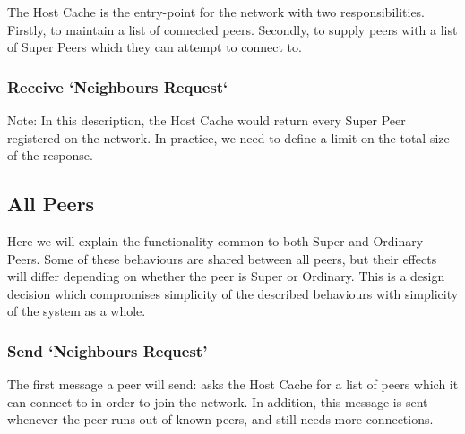 The Host Cache is the entry-point for the network with two responsibilities.
Firstly, to maintain a list of connected peers. Secondly, to supply peers with a
list of Super Peers which they can attempt to connect to.

\subsubsection{Receive `Neighbours Request`}

Note: In this description, the Host Cache would return every Super Peer
registered on the network. In practice, we need to define a limit on the total
size of the response.

\begin{algorithm}[H]

  \;
\end{algorithm}

\subsection{All Peers}

Here we will explain the functionality common to both Super and Ordinary Peers.
Some of these behaviours are shared between all peers, but their effects will
differ depending on whether the peer is Super or Ordinary.  This is a design
decision which compromises simplicity of the described behaviours with
simplicity of the system as a whole.

\subsubsection{Send `Neighbours Request'}

The first message a peer will send: asks the Host Cache for a list of peers
which it can connect to in order to join the network. In addition, this message
is sent whenever the peer runs out of known peers, and still needs more
connections.

